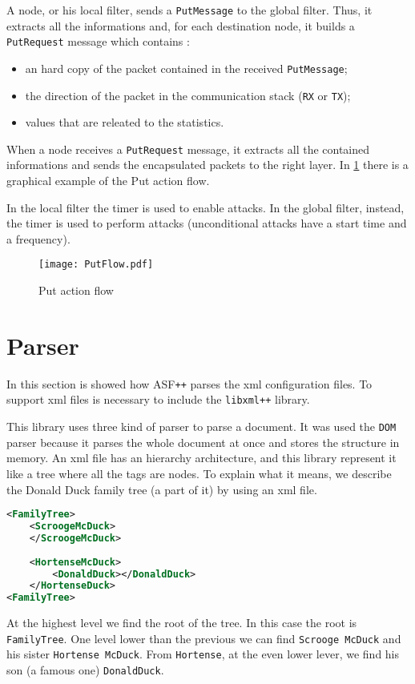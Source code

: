 A node, or his local filter, sends a \texttt{PutMessage} to the global filter. Thus, it extracts all the informations and, for each destination node, it builds a \texttt{PutRequest} message which contains :
%
\begin{itemize}
\item an hard copy of the packet contained in the received \texttt{PutMessage};
\item the direction of the packet in the communication stack (\texttt{RX} or \texttt{TX});
\item values that are releated to the statistics.
\end{itemize} 

When a node receives a \texttt{PutRequest} message, it extracts all the contained informations and sends the encapsulated packets to the right layer. In \ref{fig:put} there is a graphical example of the Put action flow.

In the local filter the timer is used to enable attacks. In the global filter, instead, the timer is used to perform attacks (unconditional attacks have a start time and a frequency).
%
\begin{figure}
\centering
\texttt{[image: PutFlow.pdf]}
\caption{Put action flow}
\label{fig:put}
\end{figure} 




\section{Parser}
\label{sec:Parser}
In this section is showed how ASF\texttt{++} parses the xml configuration files. To support xml files is necessary to include the \texttt{libxml++} library. 

This library uses three kind of parser to parse a document. It was used the \texttt{DOM} parser because it parses the whole document at once and stores the structure in memory. An xml file has an hierarchy architecture, and this library represent it like a tree where all the tags are nodes.
To explain what it means, we describe the Donald Duck family tree (a part of it) by using an xml file.
%
\begin{lstlisting}[language={xml}]
<FamilyTree>
	<ScroogeMcDuck>
	</ScroogeMcDuck>
    
	<HortenseMcDuck>
		<DonaldDuck></DonaldDuck>
	</HortenseDuck>
<FamilyTree>    
\end{lstlisting}  

At the highest level we find the root of the tree. In this case the root is \texttt{FamilyTree}.
One level lower than the previous we can find \texttt{Scrooge McDuck} and his sister \texttt{Hortense McDuck}. From \texttt{Hortense}, at the even lower lever, we find his son (a famous one) \texttt{DonaldDuck}. 

